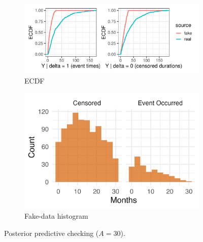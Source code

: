 \begin{figure}[H]
\centering
\begin{subfigure}[t]{0.64\textwidth}
  \centering
  \includegraphics[width=\textwidth]{images/ppc_two_a30.pdf}  %
  \caption{{\small ECDF}}
  \label{fig:ecdf-event_a30}
\end{subfigure}
\begin{subfigure}[t]{0.35\textwidth}
  \centering
  \includegraphics[width=\linewidth]{images/fake_duration_hist_a30.png}   %
  \caption{{\small Fake-data histogram}}
  \label{fig:fake-hist_a30}
\end{subfigure}
\caption{{\small Posterior predictive checking ($A=30$).}}
\label{fig:ppc-A30}
\end{figure}
